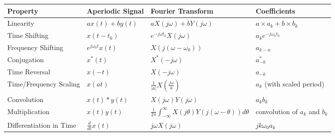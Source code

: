 \documentclass[8pt]{extarticle}
\begin{document}
\begin{table}[h]
    \centering
    \begin{tabular}{|l|l|l|l|}
        \hline
        \textbf{Property}            & \textbf{Aperiodic Signal}             & \textbf{Fourier Transform}                                                        & \textbf{Coefficients}                     \\ \hline
        Linearity                    & $a x(t) + b y(t)$                     & $a X(j\omega) + b Y(j\omega)$                                                     & $a\times a_k+b\times b_k$                 \\ \hline
        Time Shifting                & $x(t - t_0)$                          & $e^{-j\omega t_0} X(j\omega)$                                                     & $a_k e^{-j\omega_0 t_0}$                  \\ \hline
        Frequency Shifting           & $e^{j\omega_0 t} x(t)$                & $X(j(\omega - \omega_0))$                                                         & $a_{k-n}$                                 \\ \hline
        Conjugation                  & $x^*(t)$                              & $X^*(-j\omega)$                                                                   & $a^*_{-k}$                                \\ \hline
        Time Reversal                & $x(-t)$                               & $X(-j\omega)$                                                                     & $a_{-k}$                                  \\ \hline
        Time/Frequency Scaling       & $x(at)$                               & $\frac{1}{|a|} X\left(\frac{j\omega}{a}\right)$                                   & $a_k$ (with scaled period)                \\ \hline
        Convolution                  & $x(t) * y(t)$                         & $X(j\omega) Y(j\omega)$                                                           & $a_k b_k$                                 \\ \hline
        Multiplication               & $x(t) y(t)$                           & $\frac{1}{2\pi} \int_{-\infty}^{\infty} X(j\theta) Y(j(\omega - \theta)) d\theta$ & convolution of $a_k$ and $b_k$            \\ \hline
        Differentiation in Time      & $\frac{d}{dt} x(t)$                   & $j\omega X(j\omega)$                                                              & $j k \omega_0 a_k$                        \\ \hline

\end{tabular}
\end{table}
\end{document}
